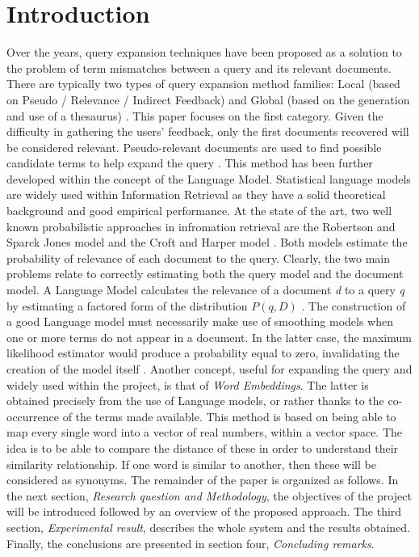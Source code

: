 \section*{Introduction}
Over the years, query expansion techniques have been proposed as a solution 
to the problem of term mismatches between a query and its relevant documents. 
There are typically two types of query expansion method families: 
Local (based on Pseudo / Relevance / Indirect Feedback) and Global (based 
on the generation and use of a thesaurus) \cite{01}. This paper focuses on the 
first category. Given the difficulty in gathering the users' feedback, only the 
first documents recovered will be considered relevant. Pseudo-relevant documents 
are used to find possible candidate terms to help expand the query \cite{02}.
This method has been further developed within the concept of the Language
Model\cite{06}. Statistical language models are widely used within Information 
Retrieval as they have a solid theoretical background and good empirical performance. 
At the state of the art, two well known probabilistic approaches 
in infromation retrieval are the Robertson and Sparck Jones model \cite{07} and 
the Croft and Harper model \cite{08}. Both models estimate the probability of relevance 
of each document to the query. Clearly, the two main problems relate 
to correctly estimating both the query model and the document model. A 
Language Model calculates the relevance of a document \emph{d} to a query \emph{q} by 
estimating a factored form of the distribution $P (q, D)$ \cite{03}. The construction 
of a good Language model must necessarily make use of smoothing models 
when one or more terms do not appear in a document. In the latter case, the 
maximum likelihood estimator would produce a probability equal to zero, 
invalidating the creation of the model itself \cite{04}\cite{05}. Another concept, useful 
for expanding the query and widely used within the project, is that of 
\emph{Word Embeddings}. The latter is obtained precisely from the use of Language 
models, or rather thanks to the co-occurrence of the terms made available. 
This method is based on being able to map every single word into a vector of 
real numbers, within a vector space. The idea is to be able to compare the 
distance of these in order to understand their similarity relationship. If one 
word is similar to another, then these will be considered as synonyms. The 
remainder of the paper is organized as follows. In the next section, \emph{Research 
question and Methodology}, the objectives of the project will be introduced 
followed by an overview of the proposed approach. The third section, \emph{Experimental 
result}, describes the whole system and the results obtained. Finally, 
the conclusions are presented in section four, \emph{Concluding remarks}.